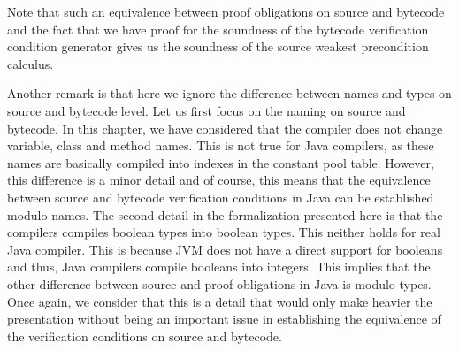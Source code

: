 Note that such an equivalence between proof obligations on source and bytecode and the fact that
we have proof for the soundness of the bytecode verification condition generator
 gives us the soundness of the source  weakest precondition calculus.  

Another remark is that here we ignore the difference between names and types on  source and bytecode level. 
Let us first focus on the naming on source and bytecode. 
In this chapter, we have considered that the compiler  does not change  variable, class and method  names.
 This is not true for Java compilers, as these names are basically compiled into 
indexes in the constant pool table. However, this difference is a minor detail and of course, this means that 
the equivalence between source and bytecode verification conditions in Java can be established modulo names.
The second detail in the formalization presented here is that the compilers compiles boolean types into boolean types.
This neither holds for real Java compiler. This is because JVM does not have a direct support  for booleans and thus,
Java compilers compile booleans into integers. This implies that the other difference between source and proof
obligations in Java is modulo types. Once again, we consider that this is a detail that would only make heavier
the presentation without being an important issue in establishing the equivalence of the verification conditions on source and bytecode. 

